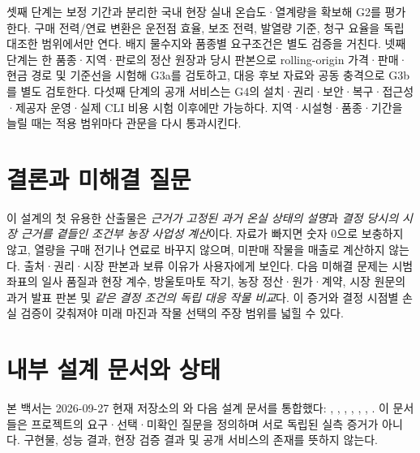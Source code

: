 \documentclass[11pt,a4paper]{article}
\begin{document}
셋째 단계는 보정 기간과 분리한 국내 현장 실내 온습도·열계량을 확보해 G2를 평가한다. 구매 전력/연료 변환은 운전점 효율, 보조 전력, 발열량 기준, 청구 요율을 독립 대조한 범위에서만 연다. 배지 물수지와 품종별 요구조건은 별도 검증을 거친다. 넷째 단계는 한 품종·지역·판로의 정산 원장과 당시 판본으로 rolling-origin 가격·판매·현금 경로 및 기준선을 시험해 G3a를 검토하고, 대응 후보 자료와 공동 충격으로 G3b를 별도 검토한다. 다섯째 단계의 공개 서비스는 G4의 설치·권리·보안·복구·접근성·제공자 운영·실제 CLI 비용 시험 이후에만 가능하다. 지역·시설형·품종·기간을 늘릴 때는 적용 범위마다 관문을 다시 통과시킨다.

\section{결론과 미해결 질문}
이 설계의 첫 유용한 산출물은 \emph{근거가 고정된 과거 온실 상태의 설명}과 \emph{결정 당시의 시장 근거를 곁들인 조건부 농장 사업성 계산}이다. 자료가 빠지면 숫자 0으로 보충하지 않고, 열량을 구매 전기나 연료로 바꾸지 않으며, 미판매 작물을 매출로 계산하지 않는다. 출처·권리·시장 판본과 보류 이유가 사용자에게 보인다. 다음 미해결 문제는 시범 좌표의 일사 품질과 현장 계수, 방울토마토 작기, 농장 정산·원가·계약, 시장 원문의 과거 발표 판본 및 \emph{같은 결정 조건의 독립 대응 작물 비교}다. 이 증거와 결정 시점별 손실 검증이 갖춰져야 미래 마진과 작물 선택의 주장 범위를 넓힐 수 있다.

\section*{내부 설계 문서와 상태}
{}
본 백서는 2026-09-27 현재 저장소의 와 다음 설계 문서를 통합했다: , , , , , , . 이 문서들은 프로젝트의 요구·선택·미확인 질문을 정의하며 서로 독립된 실측 증거가 아니다. 구현물, 성능 결과, 현장 검증 결과 및 공개 서비스의 존재를 뜻하지 않는다.
\end{document}
